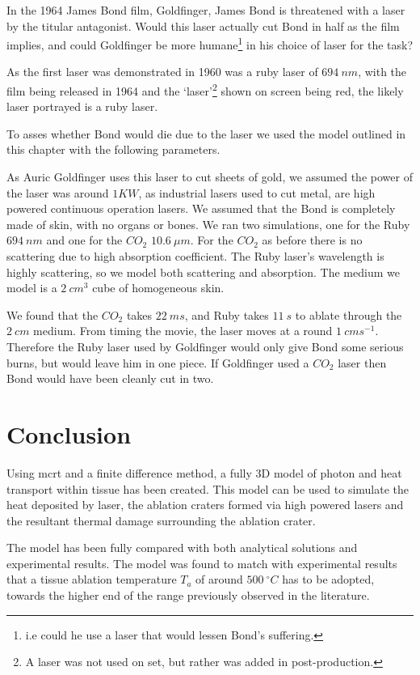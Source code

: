 In the 1964 James Bond film, Goldfinger, James Bond is threatened with a laser by the titular antagonist.
Would this laser actually cut Bond in half as the film implies, and could Goldfinger be more humane\footnote{i.e could he use a laser that would lessen Bond's suffering.} in his choice of laser for the task?

As the first laser was demonstrated in 1960 was a ruby laser of $694~nm$, with the film being released in 1964 and the `laser'\footnote{A laser was not used on set, but rather was added in post-production.} shown on screen being red, the likely laser portrayed is a ruby laser.

To asses whether Bond would die due to the laser we used the model outlined in this chapter with the following parameters.

As Auric Goldfinger uses this laser to cut sheets of gold, we assumed the power of the laser was around $1 KW$, as industrial lasers used to cut metal, are high powered continuous operation lasers.
We assumed that the Bond is completely made of skin, with no organs or bones.
We ran two simulations, one for the Ruby $694~nm$ and one for the $CO_2$ $10.6~\mu m$.
For the $CO_2$ as before there is no scattering due to high absorption coefficient. The Ruby laser's wavelength is highly scattering, so we model both scattering and absorption.
The medium we model is a $2~cm^3$ cube of homogeneous skin.

We found that the $CO_2$ takes $22~ms$, and Ruby takes $11~s$ to ablate through the $2~cm$ medium.
From timing the movie, the laser moves at a round $1~cms^{-1}$.
Therefore the Ruby laser used by Goldfinger would only give Bond some serious burns, but would leave him in one piece.
If Goldfinger used a $CO_2$ laser then Bond would have been cleanly cut in two.


\section{Conclusion}

Using \gls*{mcrt} and a finite difference method, a fully 3D model of photon and heat transport within tissue has been created. This model can be used to simulate the heat deposited by laser, the ablation craters formed via high powered lasers and the resultant thermal damage surrounding the ablation crater.

The model has been fully compared with both analytical solutions and experimental results. The model was found to match with experimental results that a tissue ablation temperature $T_a$ of around $500~^{\circ}C$ has to be adopted, towards the higher end of the range previously observed in the literature.

